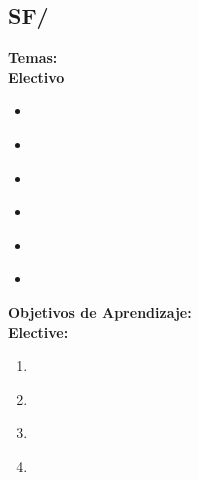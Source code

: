 \subsection{SF/\SFQuantitativeEvaluation}\label{sec:BOK:SFQuantitativeEvaluation}
\noindent \textbf{Temas:}\\
\noindent \textbf{Electivo}
\begin{itemize}
	\item \SFQuantitativeEvaluationTopicAnalytical\label{sec:BOK:SFQuantitativeEvaluationTopicAnalytical}
	\item \SFQuantitativeEvaluationTopicOrder\label{sec:BOK:SFQuantitativeEvaluationTopicOrder}
	\item \SFQuantitativeEvaluationTopicAnalysis\label{sec:BOK:SFQuantitativeEvaluationTopicAnalysis}
	\item \SFQuantitativeEvaluationTopicEvents\label{sec:BOK:SFQuantitativeEvaluationTopicEvents}
	\item \SFQuantitativeEvaluationTopicUnderstanding\label{sec:BOK:SFQuantitativeEvaluationTopicUnderstanding}
	\item \SFQuantitativeEvaluationTopicMicrobenchmarking\label{sec:BOK:SFQuantitativeEvaluationTopicMicrobenchmarking}
\end{itemize}


\noindent \textbf{Objetivos de Aprendizaje:}\\
\noindent \textbf{Elective:}
\begin{enumerate}
	\setcounter{enumi}{0}
	\item \SFQuantitativeEvaluationLOExplainTheWhich\xspace[\SFQuantitativeEvaluationLOExplainTheWhichLevel]\label{sec:BOK:SFQuantitativeEvaluationLOExplainTheWhich}
	\item \SFQuantitativeEvaluationLOExplainTheBenchmarks\xspace[\SFQuantitativeEvaluationLOExplainTheBenchmarksLevel]\label{sec:BOK:SFQuantitativeEvaluationLOExplainTheBenchmarks}
	\item \SFQuantitativeEvaluationLOUseLimit\xspace[\SFQuantitativeEvaluationLOUseLimitLevel]\label{sec:BOK:SFQuantitativeEvaluationLOUseLimit}
	\item \SFQuantitativeEvaluationLOConductAOn\xspace[\SFQuantitativeEvaluationLOConductAOnLevel]\label{sec:BOK:SFQuantitativeEvaluationLOConductAOn}
\end{enumerate}




\section{\SP}\label{sec:BOK:SP}
\SPBOKDescription

